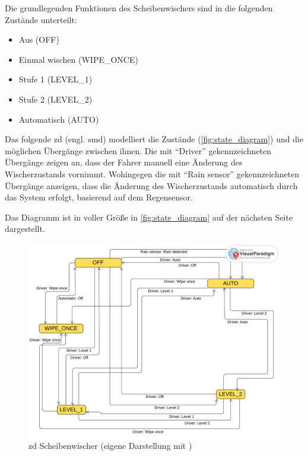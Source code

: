 \documentclass[
%
ngerman %
%
numeric %
]{wbh-assignment}
\begin{document}
\vspace*{5mm}

Die grundlegenden Funktionen des Scheibenwischers sind in die folgenden Zustände unterteilt:

\begin{itemize}
    \item Aus (OFF)
    \item Einmal wischen (WIPE\_ONCE)
    \item Stufe 1 (LEVEL\_1)
    \item Stufe 2 (LEVEL\_2)
    \item Automatisch (AUTO)
\end{itemize}

Das folgende \ac{zd} (engl. \ac{smd}) modelliert die Zustände (\autoref{fig:state_diagram}) und die möglichen Übergänge zwischen ihnen.
Die mit \enquote{Driver} gekennzeichneten Übergänge zeigen an, dass der Fahrer manuell eine Änderung des Wischerzustands vornimmt.
Wohingegen die mit \enquote{Rain sensor} gekennzeichneten Übergänge anzeigen, dass die Änderung des Wischerzustands automatisch durch das System erfolgt, basierend auf dem Regensensor.

Das Diagramm ist in voller Größe in \autoref{fig:state_diagram} auf der nächsten Seite dargestellt.

\begin{figure}[htb!]
	\centering
	\includegraphics[width=1\linewidth]{Images/wiper_state_diagramm.pdf}
	\caption[\ac{zd} Scheibenwischer (eigene Darstellung mit \cite{VisualParadigmOnlineProduktivitatssuite})]{\ac{zd} Scheibenwischer (eigene Darstellung mit \cite{VisualParadigmOnlineProduktivitatssuite})}
	\label{fig:state_diagram}
\end{figure}
\end{document}
